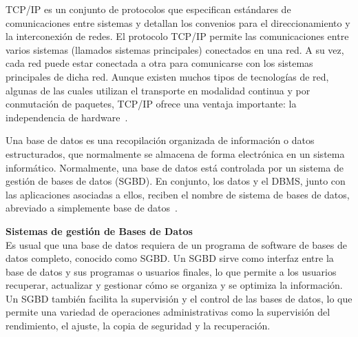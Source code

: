 TCP/IP es un conjunto de protocolos que especifican estándares de comunicaciones entre sistemas y detallan los convenios para el direccionamiento y la interconexión de redes. El protocolo TCP/IP permite las comunicaciones entre varios sistemas (llamados sistemas principales) conectados en una red. A su vez, cada red puede estar conectada a otra para comunicarse con los sistemas principales de dicha red. Aunque existen muchos tipos de tecnologías de red, algunas de las cuales utilizan el transporte en modalidad continua y por conmutación de paquetes, TCP/IP ofrece una ventaja importante: la independencia de hardware~\cite{protocolo-tcp-ip}.

Una base de datos es una recopilación organizada de información o datos estructurados, que normalmente se almacena de forma electrónica en un sistema informático. Normalmente, una base de datos está controlada por un sistema de gestión de bases de datos (SGBD). En conjunto, los datos y el DBMS, junto con las aplicaciones asociadas a ellos, reciben el nombre de sistema de bases de datos, abreviado a simplemente base de datos~\cite{Quéesuna68}.

\textbf{Sistemas de gestión de Bases de Datos} \\
Es usual que una base de datos requiera de un programa de software de bases de datos completo, conocido como SGBD. Un SGBD sirve como interfaz entre la base de datos y sus programas o usuarios finales, lo que permite a los usuarios recuperar, actualizar y gestionar cómo se organiza y se optimiza la información. Un SGBD también facilita la supervisión y el control de las bases de datos, lo que permite una variedad de operaciones administrativas como la supervisión del rendimiento, el ajuste, la copia de seguridad y la recuperación.~\cite{Quéesuna68}


